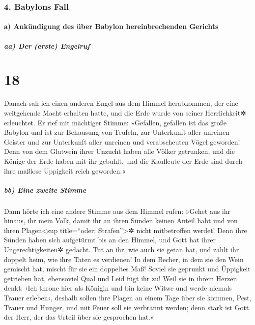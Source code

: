 \hypertarget{babylons-fall}{%
\subsubsection{4. Babylons Fall}\label{babylons-fall}}

\hypertarget{a-ankuxfcndigung-des-uxfcber-babylon-hereinbrechenden-gerichts}{%
\paragraph{a) Ankündigung des über Babylon hereinbrechenden
Gerichts}\label{a-ankuxfcndigung-des-uxfcber-babylon-hereinbrechenden-gerichts}}

\hypertarget{aa-der-erste-engelruf}{%
\subparagraph{aa) Der (erste) Engelruf}\label{aa-der-erste-engelruf}}

\hypertarget{section-17}{%
\section{18}\label{section-17}}

 Danach sah ich einen anderen Engel aus dem Himmel
herabkommen, der eine weitgehende Macht erhalten hatte, und die Erde
wurde von seiner Herrlichkeit✲ erleuchtet.  Er rief mit
mächtiger Stimme: »Gefallen, gefallen ist das große Babylon und ist zur
Behausung von Teufeln, zur Unterkunft aller unreinen Geister und zur
Unterkunft aller unreinen und verabscheuten Vögel geworden!
 Denn von dem Glutwein ihrer Unzucht haben alle Völker
getrunken, und die Könige der Erde haben mit ihr gebuhlt, und die
Kaufleute der Erde sind durch ihre maßlose Üppigkeit reich geworden.«

\hypertarget{bb-eine-zweite-stimme}{%
\subparagraph{bb) Eine zweite Stimme}\label{bb-eine-zweite-stimme}}

 Dann hörte ich eine andere Stimme aus dem Himmel rufen:
»Gehet aus ihr hinaus, ihr mein Volk, damit ihr an ihren Sünden keinen
Anteil habt und von ihren Plagen\textless sup title=``oder:
Strafen''\textgreater✲ nicht mitbetroffen werdet!  Denn
ihre Sünden haben sich aufgetürmt bis an den Himmel, und Gott hat ihrer
Ungerechtigkeiten✲ gedacht.  Tut an ihr, wie auch sie
getan hat, und zahlt ihr doppelt heim, wie ihre Taten es verdienen! In
dem Becher, in dem sie den Wein gemischt hat, mischt für sie ein
doppeltes Maß!  Soviel sie geprunkt und Üppigkeit
getrieben hat, ebensoviel Qual und Leid fügt ihr zu! Weil sie in ihrem
Herzen denkt: ›Ich throne hier als Königin und bin keine Witwe und werde
niemals Trauer erleben‹,  deshalb sollen ihre Plagen an
einem Tage über sie kommen, Pest, Trauer und Hunger, und mit Feuer soll
sie verbrannt werden; denn stark ist Gott der Herr, der das Urteil über
sie gesprochen hat.«

